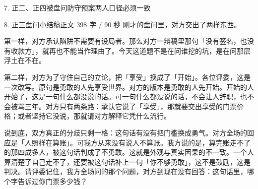 \documentclass[script,pro]{debate}
\begin{document}
\begin{stage}{7. 正二、正四被盘问防守预案}{两人口径必须一致}
\begin{qaa}
\end{qaa}
\end{stage}

\begin{speech}{8. 正三盘问小结稿}{正文 398 字 / 90 秒}
刚才的盘问里，对方交出了两样东西。

第一样，对方承认陷阱不需要有设局者。那么对方一辩稿里那句「没有签名，也没有收款方」，就再也不能当作理由了。今天这道题不是在问谁挖的坑，是在问那层浮土在不在。

第二样，对方为了守住自己的立论，把「享受」换成了「开始」。各位评委，这是一次改写。原句是勇敢的人先享受世界。对方的版本是勇敢的人先开始。开始的人开始了，这是一句什么都没说的话。可一句什么都没说的话，不会让人辞职，也不会被骂三年。对方只有两条路：承认它说了「享受」，那就要交出享受的门票价格；或者坚持它没说，那就请对方解释它凭什么流行。

说到底，双方真正的分歧只剩一格：这句话有没有把门槛换成勇气。对方全场的回应是「人照样在算账」。可我方从来没有说人不算账。我方说的是，算完账走不了的那四成多人，被这句话判成了不勇敢。这就是外观与真实因果的不一致。一个人算清楚了自己走不了，还要被这句话补上一句「你不够勇敢」，这不是鼓励，这是判决。请评委记住，我方全场问的那个问题，对方到现在没有回答：这句话里，哪个字告诉过你门票多少钱？
\end{speech}
\end{document}
